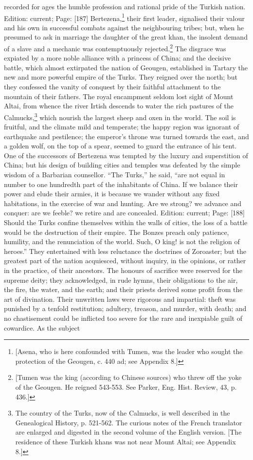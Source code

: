 recorded for ages the humble profession and rational pride of the Turkish nation. Edition: current; Page: [187] Bertezena,\footnote{[Asena, who is here confounded with Tumen, was the leader who sought the protection of the Geougen, c. 440 ad; see Appendix 8.]} their first leader, signalised their valour and his own in successful combats against the neighbouring tribes; but, when he presumed to ask in marriage the daughter of the great khan, the insolent demand of a slave and a mechanic was contemptuously rejected.\footnote{[Tumen was the king (according to Chinese sources) who threw off the yoke of the Geougen. He reigned 543-553. See Parker, Eng. Hist. Review, 43, p. 436.]} The disgrace was expiated by a more noble alliance with a princess of China; and the decisive battle, which almost extirpated the nation of Geougen, established in Tartary the new and more powerful empire of the Turks. They reigned over the north; but they confessed the vanity of conquest by their faithful attachment to the mountain of their fathers. The royal encampment seldom lost sight of Mount Altai, from whence the river Irtish descends to water the rich pastures of the Calmucks,\footnote{The country of the Turks, now of the Calmucks, is well described in the Genealogical History, p. 521-562. The curious notes of the French translator are enlarged and digested in the second volume of the English version. [The residence of these Turkish khans was not near Mount Altai; see Appendix 8.]} which nourish the largest sheep and oxen in the world. The soil is fruitful, and the climate mild and temperate; the happy region was ignorant of earthquake and pestilence; the emperor\texthebrew{}’s throne was turned towards the east, and a golden wolf, on the top of a spear, seemed to guard the entrance of his tent. One of the successors of Bertezena was tempted by the luxury and superstition of China; but his design of building cities and temples was defeated by the simple wisdom of a Barbarian counsellor. \texthebrew{“}The Turks,\texthebrew{}” he said, \texthebrew{“}are not equal in number to one hundredth part of the inhabitants of China. If we balance their power and elude their armies, it is because we wander without any fixed habitations, in the exercise of war and hunting. Are we strong? we advance and conquer: are we feeble? we retire and are concealed. Edition: current; Page: [188] Should the Turks confine themselves within the walls of cities, the loss of a battle would be the destruction of their empire. The Bonzes preach only patience, humility, and the renunciation of the world. Such, O king! is not the religion of heroes.\texthebrew{}” They entertained with less reluctance the doctrines of Zoroaster; but the greatest part of the nation acquiesced, without inquiry, in the opinions, or rather in the practice, of their ancestors. The honours of sacrifice were reserved for the supreme deity; they acknowledged, in rude hymns, their obligations to the air, the fire, the water, and the earth; and their priests derived some profit from the art of divination. Their unwritten laws were rigorous and impartial: theft was punished by a tenfold restitution; adultery, treason, and murder, with death; and no chastisement could be inflicted too severe for the rare and inexpiable guilt of cowardice. As the subject 